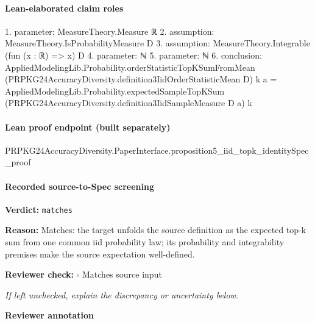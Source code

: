 \documentclass[10pt]{article}
\newcommand{\reviewerbox}{%
  \par\noindent\fbox{\parbox{0.96\linewidth}{\rule{0pt}{0.38in}}}\par
}
\newcommand{\reviewmatch}[1]{%
  \par\noindent\textbf{Reviewer check:} $\square$\; #1\par
  \noindent\emph{If left unchecked, explain the discrepancy or uncertainty below.}\par
}
\begin{document}
\paragraph{Lean-elaborated claim roles}\begin{ReviewVerbatim}
1. parameter: MeasureTheory.Measure ℝ
2. assumption: MeasureTheory.IsProbabilityMeasure D
3. assumption: MeasureTheory.Integrable (fun (x : ℝ) => x) D
4. parameter: ℕ
5. parameter: ℕ
6. conclusion: AppliedModelingLib.Probability.orderStatisticTopKSumFromMean
    (PRPKG24AccuracyDiversity.definition3IidOrderStatisticMean D) k a =
  AppliedModelingLib.Probability.expectedSampleTopKSum (PRPKG24AccuracyDiversity.definition3IidSampleMeasure D a) k
\end{ReviewVerbatim}

\paragraph{Lean proof endpoint (built separately)}\begin{ReviewVerbatim}
PRPKG24AccuracyDiversity.PaperInterface.proposition5_iid_topk_identitySpec_proof
\end{ReviewVerbatim}

\paragraph{Recorded source-to-Spec screening}
\textbf{Verdict:} \texttt{matches}
\\
{\raggedright
\textbf{Reason:} Matches:\allowbreak{} the target unfolds the source definition as the expected top-\allowbreak{}k sum from one common iid probability law;\allowbreak{} its probability and integrability premises make the source expectation well-\allowbreak{}defined.\allowbreak{}
\par}
\reviewmatch{Matches source input}
\noindent\textbf{Reviewer annotation}\par
\reviewerbox
\end{document}
